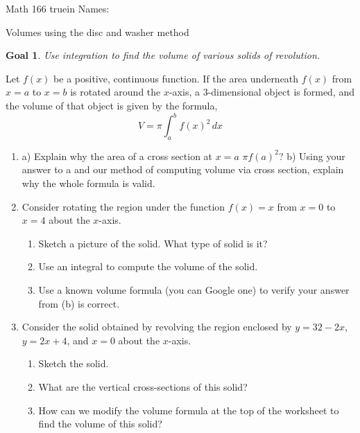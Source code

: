 \documentclass[12pt]{article}
\newtheorem*{goal}{Goal}
\begin{document}
\pagestyle{empty} %

\noindent
{Math 166  truein  Names:\ \hrulefill}

\noindent
{Volumes using the disc and washer method}

\medskip

\begin{goal} \rm
Use integration to find the volume of various \emph{solids of revolution}.
\end{goal}

 Let $f(x)$ be a positive, continuous function.  If the area underneath $f(x)$ from $x = a$ to $x = b$ is rotated around the $x$-axis, a $3$-dimensional object is formed, and the volume of that object is given by the formula,
\[
V = \pi \int_a^b f(x)^2 \, dx
\]
\begin{enumerate}
\item \subitem a) Explain why the area of a cross section at $x=a$ $\pi f(a)^2$?
\vfill
\subitem b) Using your answer to a and our method of computing volume via cross section, explain why the whole formula is valid.
\vfill

\pagebreak
\item Consider rotating the region under the function $f(x) = x$ from $x = 0$ to $x = 4$ about the $x$-axis.
\begin{enumerate}
\item Sketch a picture of the solid.  What type of solid is it?
\vfill
\item Use an integral to compute the volume of the solid.
\vfill
\item Use a known volume formula (you can Google one) to verify your answer from (b) is correct.
\vfill
\end{enumerate}

%


\pagebreak
\item Consider the solid obtained by revolving the region enclosed by $y=32-2x$, $y=2x+4$, and $x=0$ about the $x$-axis.
\begin{enumerate}
\item Sketch the solid.
\vfill


\item What are the vertical cross-sections of this solid?
\vfill
\item How can we modify the volume formula at the top of the worksheet to find the volume of this solid?
\vfill

\end{enumerate}
\end{enumerate}
\end{document}
